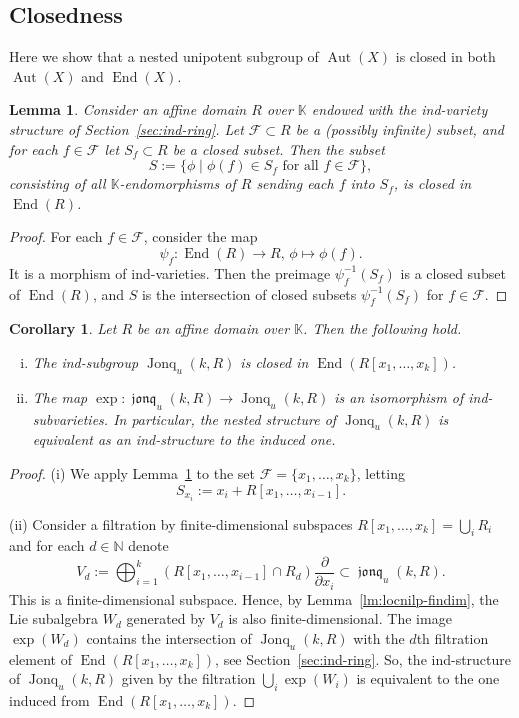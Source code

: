 \documentclass[12pt,a4paper]{amsart}
\theoremstyle{plain}
\newtheorem{lemma}[theorem]{Lemma}
\newtheorem{corollary}[theorem]{Corollary}
\theoremstyle{definition}
\theoremstyle{remark}
\def\Aut{\operatorname{Aut}}
\def\End{\operatorname{End}}
\def\NN{{\mathbb N}}
\def\K{{\mathbb K}}
\DeclareMathOperator{\Jonq}{Jonq}
\DeclareMathOperator{\jonq}{\mathfrak{jonq}}
\begin{document}
\subsection{Closedness}
Here we show that a nested unipotent subgroup of $\Aut(X)$ is closed in both $\Aut(X)$ and $\End(X)$.

\begin{lemma}\label{lm:end-closed}
   Consider an affine domain $R$ over $\K$ endowed with the ind-variety structure of Section~\ref{sec:ind-ring}. 
   Let $\mathcal{F}\subset R$ be a (possibly infinite) subset, and for each $f\in \mathcal{F}$ let $S_f\subset R$ be a closed subset. 
   Then the subset
 \[ S := \{\phi\mid  \phi(f)\in S_f \text{ for all } f\in \mathcal{F} \},\]   
   consisting of all $\K$-endomorphisms of $R$ sending each $f$ into $S_f$, is closed in $\End(R)$.
\end{lemma}
\begin{proof}
   For each $f\in \mathcal{F}$, consider the map \[\psi_f\colon \End(R)\to R,\, \phi\mapsto \phi(f).\]
   It is a morphism of ind-varieties. 
   Then the preimage $\psi_f^{-1}(S_f)$ is a closed subset of $\End(R)$,
   and $S$ is the intersection of closed subsets $\psi_f^{-1}(S_f)$ for $f\in\mathcal{F}$.
\end{proof}

\begin{corollary}\label{cr:jonq-closed}
   Let $R$ be an affine domain over $\K$.
   Then the following hold.
   \begin{enumerate}[(i)]
      \item The ind-subgroup $\Jonq_u(k,R)$ is closed in $\End(R[x_1,\ldots,x_k])$.
      \item 
   The map $\exp\colon \jonq_u(k,R)\to \Jonq_u(k,R)$ is an isomorphism of ind-subvarieties. 
   In particular, the nested structure of $\Jonq_u(k,R)$ is equivalent as an ind-structure to the induced one.
   \end{enumerate}
\end{corollary}
\begin{proof}
   (i) We apply Lemma~\ref{lm:end-closed} to the set $\mathcal{F}=\{x_1,\ldots,x_k\}$,
   letting \[S_{x_i}:= x_i+ R[x_1,\ldots,x_{i-1}].\]
  

   (ii)  Consider a filtration by finite-dimensional subspaces $R[x_1,\ldots,x_k]=\bigcup_i R_i$ and for each $d\in\NN$ denote 
   \[
   V_d := \bigoplus_{i=1}^k \left(R[x_1,\ldots,x_{i-1}]\cap R_d\right)\frac{\partial}{\partial x_i} \subset \jonq_u(k,R).
   \]
   This is a finite-dimensional subspace. Hence, by Lemma~\ref{lm:locnilp-findim}, the Lie subalgebra $W_d$ generated by $V_d$ is also finite-dimensional. 
   The image $\exp(W_d)$ contains the intersection of $\Jonq_u(k,R)$ with the $d$th filtration element of $\End(R[x_1,\ldots,x_k])$, see Section~\ref{sec:ind-ring}.
   So, the ind-structure of $\Jonq_u(k,R)$ given by the filtration $\bigcup_i \exp(W_i)$ is equivalent to the one induced from $\End(R[x_1,\ldots,x_k])$.
\end{proof}
\end{document}
